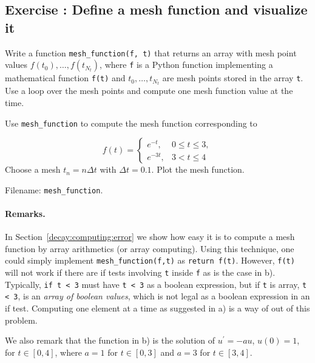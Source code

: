 \documentclass[graybox,sectrefs,envcountresetchap,open=right,final]{svmonodo}
\newenvironment{doconceexercise}{}{}
\newcounter{doconceexercisecounter}
\begin{document}
\begin{doconceexercise}

\subsection*{Exercise \thedoconceexercisecounter: Define a mesh function and visualize it}

\label{decay:exer:meshfunc}


Write a function \Verb!mesh_function(f, t)! that returns an array with
mesh point values $f(t_0),\ldots,f(t_{N_t})$, where \texttt{f} is a Python
function implementing a mathematical function \texttt{f(t)} and $t_0,\ldots,t_{N_t}$
are mesh points stored in the array \texttt{t}. Use a loop over the mesh
points and compute one mesh function value at the time.



Use \Verb!mesh_function! to compute the mesh function corresponding to

\[
f(t) = \left\lbrace
\begin{array}{ll}
e^{-t},& 0\leq t\leq 3,\\ 
e^{-3t}, & 3 < t\leq 4
\end{array}\right.
\]
Choose a mesh $t_n=n\Delta t$ with $\Delta t=0.1$.
Plot the mesh function.





\noindent Filename: \Verb!mesh_function!.


\paragraph{Remarks.}
In Section~\ref{decay:computing:error} we show how easy it is to
compute a mesh function by array arithmetics (or array computing).
Using this technique, one could simply implement \Verb!mesh_function(f,t)!
as \texttt{return f(t)}. However, \texttt{f(t)} will not work if there are
if tests involving \texttt{t} inside \texttt{f} as is the case in b). Typically,
\texttt{if t < 3} must have \texttt{t < 3} as a boolean expression, but if \texttt{t} is
array, \texttt{t < 3}, is an \emph{array of boolean values}, which is not legal
as a boolean expression in an if test.
Computing one element
at a time as suggested in a) is a way of out of this problem.

We also remark that the function in b) is the solution of $u^{\prime}=-au$,
$u(0)=1$, for $t\in [0,4]$, where $a=1$ for $t\in [0,3]$ and $a=3$ for
$t\in [3,4]$.


\end{doconceexercise}
\end{document}
